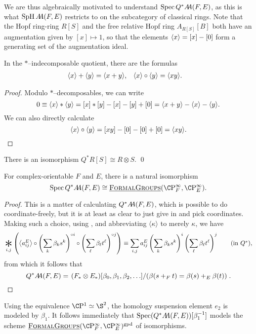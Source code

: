 We are thus algebraically motivated to understand \(\Spec Q^* \AA(F, E)\), as this is what \(\SpH \AA(F, E)\) restricts to on the subcategory of classical rings.  Note that the Hopf ring-ring \(R[S]\) and the free relative Hopf ring \(A_{R[S]}[B]\) both have an augmentation given by \([x] \mapsto 1\), so that the elements \(\<x\> = [x] - [0]\) form a generating set of the augmentation ideal.
\begin{lemma}\label{ArithmeticInQAst}
In the \(\ast\)--indecomposable quotient, there are the formulas
\begin{align*}
\<x\> + \<y\> & = \<x + y\>, &
\<x\> \circ \<y\> & = \<x y\>.
\end{align*}
\end{lemma}
\begin{proof}
Modulo \(\ast\)--decomposables, we can write \[0 \equiv \<x\> \ast \<y\> = [x] \ast [y] - [x] - [y] + [0] = \<x + y\> - \<x\> - \<y\>.\]  We can also directly calculate \[\<x\> \circ \<y\> = [x y] - [0] - [0] + [0] = \<x y\>. \qedhere\]
\end{proof}

\begin{corollary}\label{QAstAndTensors}
There is an isomorphism \(Q^* R[S] \cong R \otimes S\). \qed
\end{corollary}

\begin{corollary}
For complex-orientable \(F\) and \(E\), there is a natural isomorphism \[\Spec Q^* \AA(F, E) \cong \InternalHom{FormalGroups}(\CP^\infty_F, \CP^\infty_E).\]
\end{corollary}
\begin{proof}
This is a matter of calculating \(Q^* \AA(F, E)\), which is possible to do coordinate-freely, but it is at least as clear to just give in and pick coordinates.  Making such a choice, using , and abbreviating $\langle \kappa \rangle$ to merely $\kappa$, we have \[\bigast_{i, j} \left(\left\<a_{ij}^E\right\> \circ \left( \sum_k \beta_k s^k \right)^{\circ i} \circ \left( \sum_\ell \beta_\ell t^\ell \right)^{\circ j} \right) \equiv \sum_{i, j} a_{ij}^E \left( \sum_k \beta_k s^k \right)^i \left( \sum_\ell \beta_\ell t^\ell \right)^j \tag{in \(Q^*\)},\] from which it follows that \[Q^* \AA(F, E) = \left. (F_* \otimes E_*)[\beta_0, \beta_1, \beta_2, \ldots] \middle/ \left( \beta(s +_F t) = \beta(s) +_E \beta(t) \right) \right. . \qedhere\]
\end{proof}

\begin{remark}
Using the equivalence \(\CP^1 \simeq \S^2\), the homology suspension element \(e_2\) is modeled by \(\beta_1\).  It follows immediately that \(\Spec (Q^* \AA(F, E))[\beta_1^{-1}]\) models the scheme \(\InternalHom{FormalGroups}(\CP^\infty_F, \CP^\infty_E)^{\mathrm{gpd}}\) of isomorphisms.
\end{remark}

